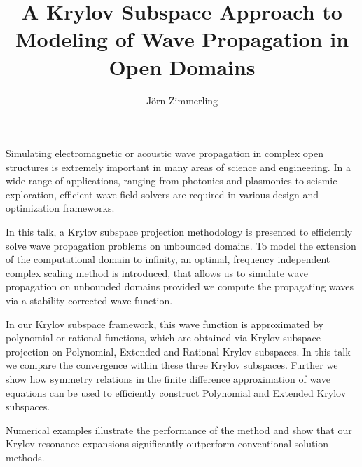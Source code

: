 \documentclass{article}
\title{A Krylov Subspace Approach to Modeling of Wave Propagation in Open Domains}
\author{J\"orn Zimmerling}
\affil{PhD student at TU Delft}
\date{}
\begin{document}
\maketitle
\setcounter{page}{9}
Simulating electromagnetic or acoustic wave propagation in complex open structures is extremely important in many areas of science and engineering. In a wide range of applications, ranging from photonics and plasmonics to seismic exploration, efficient wave field solvers are required in various design and optimization frameworks.  
 
In this talk, a Krylov subspace projection methodology is presented to efficiently solve wave propagation problems on unbounded domains. To model the extension of the computational domain to infinity, an optimal, frequency independent complex scaling method is introduced, that allows us to simulate wave propagation on unbounded domains provided we compute the propagating waves via a stability-corrected wave function.

In our Krylov subspace framework, this wave function is approximated by polynomial or rational functions, which are obtained via Krylov subspace projection on Polynomial, Extended and Rational Krylov subspaces. In this talk we compare the convergence within these three Krylov subspaces. Further we show how symmetry relations in the finite difference approximation of wave equations can be used to efficiently construct Polynomial and Extended Krylov subspaces. 

Numerical examples illustrate the performance of the method and show that our Krylov resonance expansions significantly outperform conventional solution methods.
\end{document}
